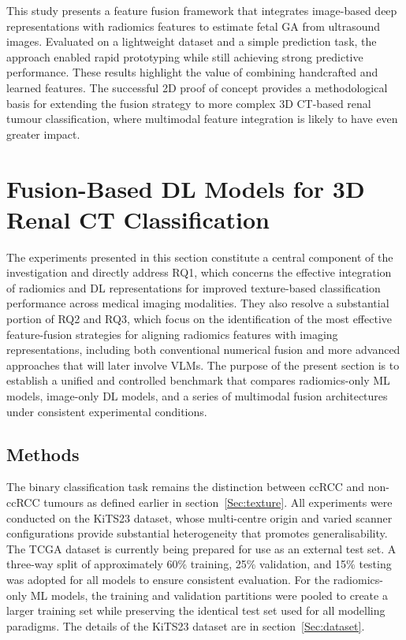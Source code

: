 \documentclass[final,british,a4paper,12pt]{phdthesis}
\begin{document}
This study presents a feature fusion framework that integrates image-based deep representations with radiomics features to estimate fetal GA from ultrasound images. Evaluated on a lightweight dataset and a simple prediction task, the approach enabled rapid prototyping while still achieving strong predictive performance. These results highlight the value of combining handcrafted and learned features. The successful 2D proof of concept provides a methodological basis for extending the fusion strategy to more complex 3D CT-based renal tumour classification, where multimodal feature integration is likely to have even greater impact.




\section{Fusion-Based DL Models for 3D Renal CT Classification}
\label{sec:fusion_models}

The experiments presented in this section constitute a central component of the investigation and directly address RQ1, which concerns the effective integration of radiomics and DL representations for improved texture-based classification performance across medical imaging modalities. They also resolve a substantial portion of RQ2 and RQ3, which focus on the identification of the most effective feature-fusion strategies for aligning radiomics features with imaging representations, including both conventional numerical fusion and more advanced approaches that will later involve VLMs. The purpose of the present section is to establish a unified and controlled benchmark that compares radiomics-only ML models, image-only DL models, and a series of multimodal fusion architectures under consistent experimental conditions.


\subsection{Methods}

The binary classification task remains the distinction between ccRCC and non-ccRCC tumours as defined earlier in section~\ref{Sec:texture}. All experiments were conducted on the KiTS23 dataset, whose multi-centre origin and varied scanner configurations provide substantial heterogeneity that promotes generalisability. The TCGA dataset is currently being prepared for use as an external test set. A three-way split of approximately 60\% training, 25\% validation, and 15\% testing was adopted for all models to ensure consistent evaluation. For the radiomics-only ML models, the training and validation partitions were pooled to create a larger training set while preserving the identical test set used for all modelling paradigms. The details of the KiTS23 dataset are in section~\ref{Sec:dataset}.
\end{document}
